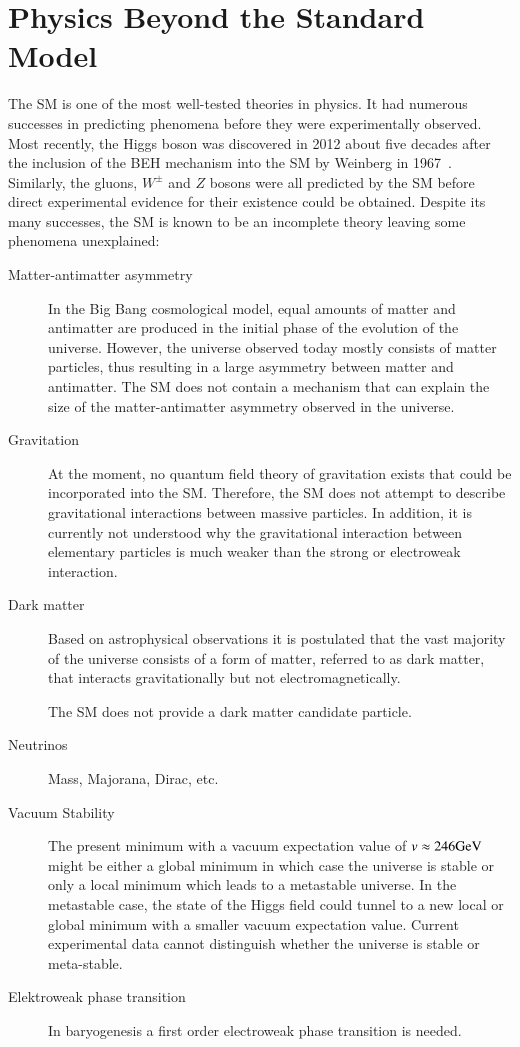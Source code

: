 \section{Physics Beyond the Standard Model}

The SM is one of the most well-tested theories in physics. It had numerous
successes in predicting phenomena before they were experimentally observed. Most
recently, the Higgs boson was discovered in 2012 about five decades after the
inclusion of the BEH mechanism into the SM by Weinberg in
1967~\cite{Weinberg:1967tq}. Similarly, the gluons, $W^\pm$ and $Z$ bosons were
all predicted by the SM before direct experimental evidence for their existence
could be obtained. Despite its many successes, the SM is known to be an
incomplete theory leaving some phenomena unexplained:
\begin{description}

\item[Matter-antimatter asymmetry] In the Big Bang cosmological model, equal
  amounts of matter and antimatter are produced in the initial phase of the
  evolution of the universe. However, the universe observed today mostly
  consists of matter particles, thus resulting in a large asymmetry between
  matter and antimatter. The SM does not contain a mechanism that can explain
  the size of the matter-antimatter asymmetry observed in the universe.

\item[Gravitation] At the moment, no quantum field theory of gravitation exists
  that could be incorporated into the SM. Therefore, the SM does not attempt to
  describe gravitational interactions between massive particles. In addition, it
  is currently not understood why the gravitational interaction between
  elementary particles is much weaker than the strong or electroweak
  interaction.

\item[Dark matter] Based on astrophysical observations it is postulated that the
  vast majority of the universe consists of a form of matter, referred to as
  dark matter, that interacts gravitationally but not electromagnetically.

  The SM does not provide a dark matter candidate particle.

\item[]

\item[Neutrinos] Mass, Majorana, Dirac, etc.

\item[Vacuum Stability] The present minimum with a vacuum expectation
  value of $v \approx \si{246}{\ensuremath{\text{GeV}}}$ might be either a global minimum
  in which case the universe is stable or only a local minimum which
  leads to a metastable universe. In the metastable case, the state of
  the Higgs field could tunnel to a new local or global minimum with a
  smaller vacuum expectation value. Current experimental data cannot
  distinguish whether the universe is stable or
  meta-stable.

\item[Elektroweak phase transition] In baryogenesis a first order
  electroweak phase transition is needed.

\end{description}
